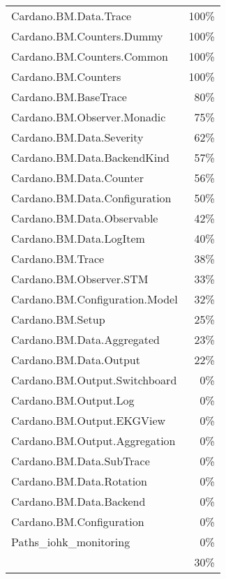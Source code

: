 \begin{tabular}{l r}
   Cardano.BM.Data.Trace & 100\% \\
   Cardano.BM.Counters.Dummy & 100\% \\
   Cardano.BM.Counters.Common & 100\% \\
   Cardano.BM.Counters & 100\% \\
   Cardano.BM.BaseTrace & 80\% \\
   Cardano.BM.Observer.Monadic & 75\% \\
   Cardano.BM.Data.Severity & 62\% \\
   Cardano.BM.Data.BackendKind & 57\% \\
   Cardano.BM.Data.Counter & 56\% \\
   Cardano.BM.Data.Configuration & 50\% \\
   Cardano.BM.Data.Observable & 42\% \\
   Cardano.BM.Data.LogItem & 40\% \\
   Cardano.BM.Trace & 38\% \\
   Cardano.BM.Observer.STM & 33\% \\
   Cardano.BM.Configuration.Model & 32\% \\
   Cardano.BM.Setup & 25\% \\
   Cardano.BM.Data.Aggregated & 23\% \\
   Cardano.BM.Data.Output & 22\% \\
   Cardano.BM.Output.Switchboard & 0\% \\
   Cardano.BM.Output.Log & 0\% \\
   Cardano.BM.Output.EKGView & 0\% \\
   Cardano.BM.Output.Aggregation & 0\% \\
   Cardano.BM.Data.SubTrace & 0\% \\
   Cardano.BM.Data.Rotation & 0\% \\
   Cardano.BM.Data.Backend & 0\% \\
   Cardano.BM.Configuration & 0\% \\
   Paths\_iohk\_monitoring & 0\% \\
    & 30\% \\
\end{tabular}
